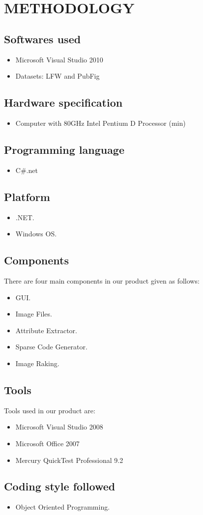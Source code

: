 \chapter{METHODOLOGY}
\section{\normalsize{\textbf{Softwares used}}}
\begin{itemize}
\item Microsoft Visual Studio 2010
\item Datasets: LFW and PubFig
\end{itemize}
\section{\normalsize{\textbf{Hardware specification}}}
\begin{itemize}
\item Computer with 80GHz Intel Pentium D Processor (min)
\end{itemize}
\section{\normalsize{\textbf{Programming language}}}
\begin{itemize}
\item C\#.net 
\end{itemize}
\section{\normalsize{\textbf{Platform}}}
\begin{itemize}
\item .NET.
\item Windows OS.
\end{itemize}
\section{\normalsize{\textbf{Components}}}
There are four main components in our product given as follows:
\begin{itemize}
\item GUI.
\item Image Files.
\item Attribute Extractor.
\item Sparse Code Generator.
\item Image Raking.
\end{itemize}
\section{\normalsize{\textbf{Tools}}}
Tools used in our product are:
\begin{itemize}
\item Microsoft Visual Studio 2008
\item Microsoft Office 2007
\item Mercury QuickTest Professional 9.2
\end{itemize}
\section{\normalsize{\textbf{Coding style followed}}}
\begin{itemize}
\item Object Oriented Programming.
\end{itemize}